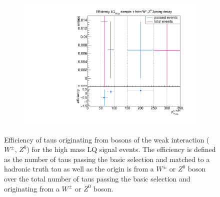 \begin{figure}
\begin{subfigure}[t]{0.49\textwidth}
                \label{Dividedprompt:signal:1prongLQ76}
                \end{subfigure}
                \begin{subfigure}[t]{0.49\textwidth}
                \includegraphics[width=\textwidth]{figures/plots/LQ76/Divided_prompt3prong.pdf}
                \label{Dividedprompt:signal:3prongLQ76}
                \end{subfigure}            
\caption[Efficiency of taus originating from bosons of the weak interaction ($W^\pm$, $Z^0$) for the high mass LQ signal events.]{Efficiency of taus originating from bosons of the weak interaction ($W^\pm$, $Z^0$) for the high mass LQ signal events. The efficiency is defined as the number of taus passing the basic selection and matched to a hadronic truth tau as well as the origin is from a $W^\pm$ or $Z^0$ boson over the total number of taus passing the basic selection and originating from a $W^\pm$ or $Z^0$ boson.}
\label{Dividedprompt:signal:LQ76}
\end{figure}
%
%
